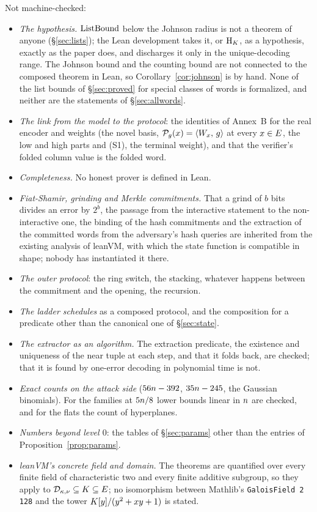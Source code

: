 Not machine-checked:
\begin{itemize}[itemsep=1pt,topsep=2pt]
\item \emph{The hypothesis.} $\mathrm{ListBound}$ below the Johnson radius is not a theorem of anyone (\S\ref{sec:lists}); the Lean development takes it, or $\mathrm{H}_{K}$, as a hypothesis, exactly as the paper does, and discharges it only in the unique-decoding range. The Johnson bound and the counting bound are not connected to the composed theorem in Lean, so Corollary~\ref{cor:johnson} is by hand. None of the list bounds of \S\ref{sec:proved} for special classes of words is formalized, and neither are the statements of \S\ref{sec:allwords}.
\item \emph{The link from the model to the protocol}: the identities of Annex~B for the real encoder and weights (the novel basis, $\mathcal{P}_g(x)=\langle W_x,\, g \rangle$ at every $x\in E$, the low and high parts and (S1), the terminal weight), and that the verifier's folded column value is the folded word.
\item \emph{Completeness.} No honest prover is defined in Lean.
\item \emph{Fiat-Shamir, grinding and Merkle commitments.} That a grind of $b$ bits divides an error by $2^b$, the passage from the interactive statement to the non-interactive one, the binding of the hash commitments and the extraction of the committed words from the adversary's hash queries are inherited from the existing analysis of leanVM, with which the state function is compatible in shape; nobody has instantiated it there.
\item \emph{The outer protocol}: the ring switch, the stacking, whatever happens between the commitment and the opening, the recursion.
\item \emph{The ladder schedules} as a composed protocol, and the composition for a predicate other than the canonical one of \S\ref{sec:state}.
\item \emph{The extractor as an algorithm.} The extraction predicate, the existence and uniqueness of the near tuple at each step, and that it folds back, are checked; that it is found by one-error decoding in polynomial time is not.
\item \emph{Exact counts on the attack side} ($56n-392$, $35n-245$, the Gaussian binomials). For the families at $5n/8$ lower bounds linear in $n$ are checked, and for the flats the count of hyperplanes.
\item \emph{Numbers beyond level $0$}: the tables of \S\ref{sec:params} other than the entries of Proposition~\ref{prop:params}.
\item \emph{leanVM's concrete field and domain.} The theorems are quantified over every finite field of characteristic two and every finite additive subgroup, so they apply to $\mathcal{D}_{\kappa,\nu}\subseteq K\subseteq E$; no isomorphism between Mathlib's \texttt{GaloisField 2 128} and the tower $K[y]/(y^2+xy+1)$ is stated.
\end{itemize}

